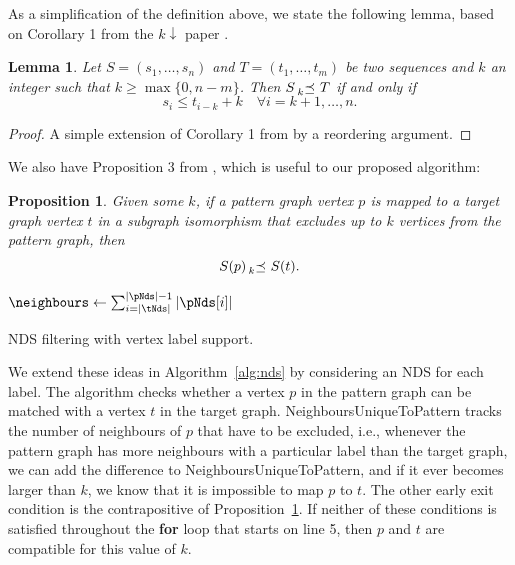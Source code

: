 \documentclass{l4proj}
\newtheorem{lemma}{Lemma}[chapter]
\newtheorem{proposition}{Proposition}[chapter]
\theoremstyle{definition}
\theoremstyle{remark}
\newcommand{\kprec}[1]{\prescript{}{#1}{\preceq}\ }
\begin{document}
As a simplification of the definition above, we state the following lemma, based
on Corollary 1 from the $k{\downarrow}$ paper \cite{DBLP:conf/aaai/HoffmannMR17}.

\begin{lemma} \label{lemma1}
  Let $S = (s_1, \dots, s_n)$ and $T = (t_1, \dots, t_m)$ be two sequences and
  $k$ an integer such that $k \ge \max\{ 0, n - m \}$. Then $S \kprec{k} T$
  if and only if
  \[ s_i \le t_{i-k} + k \quad \forall i = k + 1, \dots, n. \]
\end{lemma}

\begin{proof}
  A simple extension of Corollary 1 from \cite{DBLP:conf/aaai/HoffmannMR17} by a
  reordering argument.
\end{proof}

We also have Proposition 3 from \cite{DBLP:conf/aaai/HoffmannMR17}, which is
useful to our proposed algorithm:

\begin{proposition} \label{prop:kdown}
  Given some $k$, if a pattern graph vertex $p$ is mapped to a target graph
  vertex $t$ in a subgraph isomorphism that excludes up to $k$ vertices from the
  pattern graph, then
  \[ S(p) \kprec{k} S(t). \]
\end{proposition}

\begin{algorithm}
  $\neighbours \gets \sum_{i=|\tNds|}^{|\pNds| - 1} |\pNds[i]|$\;
  \For{$i \gets 0$ \KwTo $\min\{ |\pNds|, |\tNds| \} - 1$}{
    \If{$|\pNds[i]| - |\tNds[i]| > 0$}{
      $\neighbours \gets \neighbours + |\pNds[i]| - |\tNds[i]|$\;
      \lIf{$\neighbours > k$}{\Return{false}}
    }
    \lIf{$\pNds[i] \cancel{\kprec{k}} \tNds[i]$}{\Return{false}}
  }
  \;
  \caption{NDS filtering with vertex label support.}
  \label{alg:nds}
\end{algorithm}

We extend these ideas in Algorithm~\ref{alg:nds} by considering an NDS for each
label. The algorithm checks whether a vertex $p$ in the pattern graph can be
matched with a vertex $t$ in the target graph.
\textsf{NeighboursUniqueToPattern} tracks the number of neighbours of $p$ that
have to be excluded, i.e., whenever the pattern graph has more neighbours with a
particular label than the target graph, we can add the difference to
\textsf{NeighboursUniqueToPattern}, and if it ever becomes larger than $k$, we
know that it is impossible to map $p$ to $t$. The other early exit condition is
the contrapositive of Proposition~\ref{prop:kdown}. If neither of these
conditions is satisfied throughout the \textbf{for} loop that starts on line 5,
then $p$ and $t$ are compatible for this value of $k$.
\end{document}
